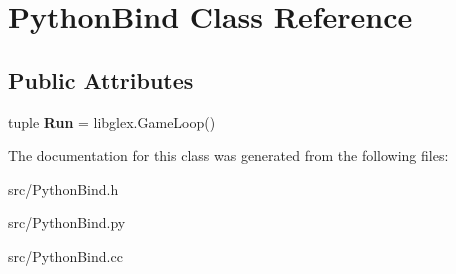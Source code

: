 \hypertarget{class_python_bind}{}\section{Python\+Bind Class Reference}
\label{class_python_bind}
\subsection*{Public Attributes}
\begin{DoxyCompactItemize}
\item 
\hypertarget{class_python_bind_a58a0da72b60d10ef74d6d572b158d30a}{}tuple {\bfseries Run} = libglex.\+Game\+Loop()\label{class_python_bind_a58a0da72b60d10ef74d6d572b158d30a}

\end{DoxyCompactItemize}


The documentation for this class was generated from the following files\+:\begin{DoxyCompactItemize}
\item 
src/Python\+Bind.\+h\item 
src/Python\+Bind.\+py\item 
src/Python\+Bind.\+cc\end{DoxyCompactItemize}
